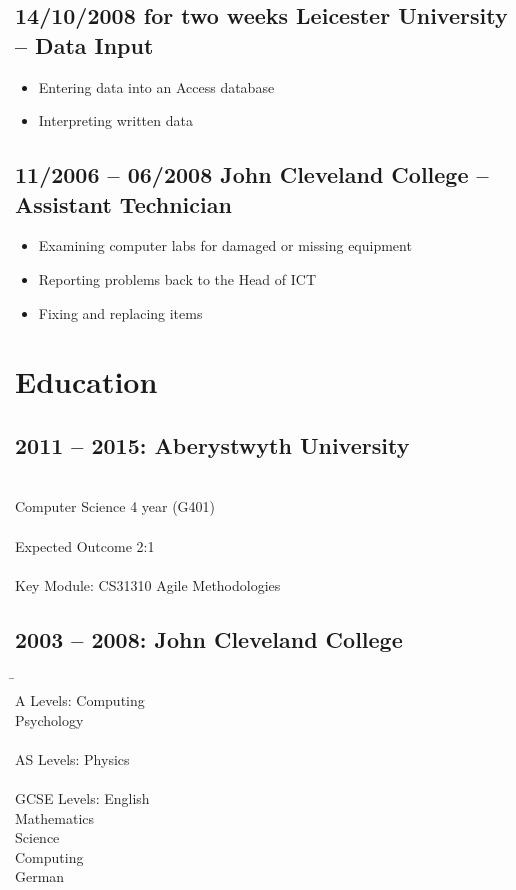 \documentclass[0pt]{article}
\begin{document}
\subsection*{14/10/2008 for two weeks     Leicester University --  Data Input}
\begin{itemize}
	\item Entering data into an Access database
	\item Interpreting written data
\end{itemize}

\subsection*{11/2006 -- 06/2008      John Cleveland College -- Assistant Technician}
\begin{itemize}
	\item Examining computer labs for damaged or missing equipment
	\item Reporting problems back to the Head of ICT
	\item Fixing and replacing items
\end{itemize}

\section*{Education}
\subsection*{2011 -- 2015: Aberystwyth University}
\begin{tabbing}
~~~~~~~~~~~~~~~~~~~~~~~~\=\\
\> Computer Science 4 year (G401)\\
\\
\> Expected Outcome 2:1\\
\\
\> Key Module: CS31310 	Agile Methodologies   
\end{tabbing}

\subsection*{2003 -- 2008: John Cleveland College}  
\begin{tabbing}
\=~~~~~~~~~~~~~~~~~~~~~~~~\=\\
\> A Levels:  \>Computing \\

\>\>Psychology\\
\\
\> AS Levels: \>Physics \\
\\
\> GCSE Levels: \>English\\

\>\>Mathematics\\

\>\>Science\\

\>\>Computing\\

\>\>German\\
\end{tabbing}
\end{document}
